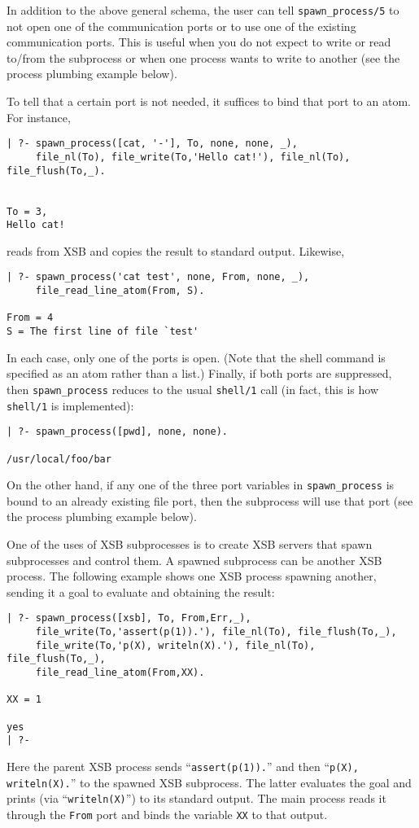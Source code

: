 In addition to the above general schema, the user can tell
\verb|spawn_process/5| to not open one of the communication ports or to
use one of the existing communication ports.  This is useful when you do
not expect to write or read to/from the subprocess or when one process
wants to write to another (see the process plumbing example below).

To tell that a certain port is not needed, it suffices to bind that port to
an atom.  For instance,
\begin{verbatim}
| ?- spawn_process([cat, '-'], To, none, none, _),
     file_nl(To), file_write(To,'Hello cat!'), file_nl(To), file_flush(To,_).


To = 3,
Hello cat!
\end{verbatim}
reads from XSB and copies the result to standard output. Likewise,
\begin{verbatim}
| ?- spawn_process('cat test', none, From, none, _),
     file_read_line_atom(From, S).

From = 4
S = The first line of file `test'
\end{verbatim}
In each case, only one of the ports is open. (Note that the shell command
is specified as an atom rather than a list.) Finally, if both ports are
suppressed, then \verb|spawn_process| reduces to the usual
{\tt shell/1} call (in fact, this is how {\tt shell/1} is implemented):
\begin{verbatim}
| ?- spawn_process([pwd], none, none).

/usr/local/foo/bar
\end{verbatim}
On the other hand, if any one of the three port variables in
\verb|spawn_process| is bound to an already existing file port, then the
subprocess will use that port (see the process plumbing example below).

One of the uses of XSB subprocesses is to create XSB servers that spawn
subprocesses and control them. A spawned subprocess can be another XSB
process. The following example shows one XSB process spawning another,
sending it a goal to evaluate and obtaining the result:
\begin{verbatim}
| ?- spawn_process([xsb], To, From,Err,_),
     file_write(To,'assert(p(1)).'), file_nl(To), file_flush(To,_),
     file_write(To,'p(X), writeln(X).'), file_nl(To), file_flush(To,_), 
     file_read_line_atom(From,XX).  

XX = 1

yes
| ?-
\end{verbatim}
Here the parent XSB process sends ``\verb|assert(p(1)).|'' and then
``\verb|p(X), writeln(X).|'' to the spawned XSB subprocess. The latter
evaluates the goal and prints (via ``\verb|writeln(X)|'')
to its standard output. The main process reads it through the {\tt From}
port and binds the variable {\tt XX} to that output.

